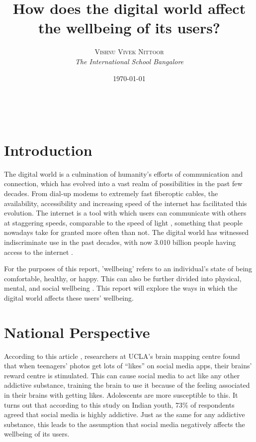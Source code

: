 \documentclass[a4paper, 11pt]{article}
\title{\textbf{How does the digital world affect the wellbeing of its users?}}
\author{\textsc{Vishnu Vivek Nittoor} \\{\textit{The International School Bangalore}}}
\date{\today}
\makeatletter
\renewcommand{\maketitle}{
\begin{flushright}
{\LARGE\@title}

\vspace{20pt}

{\large\@author}
\\\@date %

\vspace{40pt} %
\end{flushright}
}
\makeatother
\begin{document}
\maketitle

\vspace{30pt}

\section*{Introduction}

The digital world is a culmination of humanity's efforts of communication and connection, which has evolved into a vast realm of possibilities in the past few decades. From dial-up modems to extremely fast fiberoptic cables, the availability, accessibility and increasing speed of the internet has facilitated this evolution. The internet is a tool with which users can communicate with others at staggering speeds, comparable to the speed of light \cite{speedoflight-communication}, something that people nowadays take for granted more often than not. The digital world has witnessed indiscriminate use in the past decades, with now 3.010 billion people having access to the internet \cite{world-population-online}.

For the purposes of this report, 'wellbeing' refers to an individual's state of being comfortable, healthy, or happy. This can also be further divided into physical, mental, and social wellbeing \cite{physical-wellbeing-definition, who-mental-wellbeing, social-wellbeing-definition}. This report will explore the ways in which the digital world affects these users' wellbeing.

\section{National Perspective}

According to this article \cite{teens-social-media-brain}, researchers at UCLA’s brain mapping centre found that when teenagers’ photos get lots of “likes” on social media apps, their brains’ reward centre is stimulated. This can cause social media to act like any other addictive substance, training the brain to use it because of the feeling associated in their brains with getting likes. Adolescents are more susceptible to this. It turns out that according to this study on Indian youth, 73\% of respondents agreed that social media is highly addictive. Just as the same for any addictive substance, this leads to the assumption that social media negatively affects the wellbeing of its users.
\end{document}
